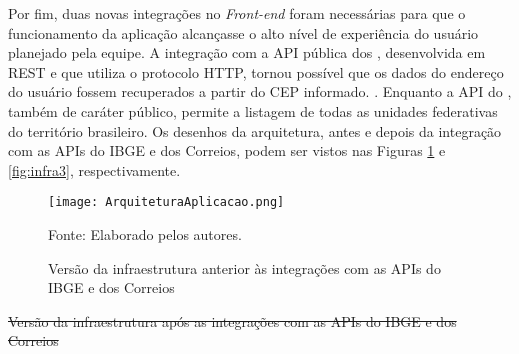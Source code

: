 \documentclass[
    12pt,               %
    openright,          %
    oneside,
    a4paper,            %
    BIBLATEX,           %
    TODO,               %
    english,            %
    brazil              %
    ]{ifsp-spo-inf-ctds}
\providecommand{\DIFdel}[1]{{\protect\color{red}\sout{#1}}}                      %
\providecommand{\DIFdelbegin}{} %
\providecommand{\DIFdelend}{} %
\providecommand{\DIFdelFL}[1]{\DIFdel{#1}} %
\newcommand{\DIFscaledelfig}{0.5}
\newlength{\DIFdelgraphicswidth} %
\newlength{\DIFdelgraphicsheight} %
\newcommand{\DIFdelincludegraphics}[2][]{%
\sbox{\DIFdelgraphicsbox}{\DIFOincludegraphics[#1]{#2}}%
\settoboxwidth{\DIFdelgraphicswidth}{\DIFdelgraphicsbox} %
\settoboxtotalheight{\DIFdelgraphicsheight}{\DIFdelgraphicsbox} %
\scalebox{\DIFscaledelfig}{%
\parbox[b]{\DIFdelgraphicswidth}{\usebox{\DIFdelgraphicsbox}\\[-\baselineskip] \rule{\DIFdelgraphicswidth}{0em}}\llap{\resizebox{\DIFdelgraphicswidth}{\DIFdelgraphicsheight}{%
\setlength{\unitlength}{\DIFdelgraphicswidth}%
\begin{picture}(1,1)%
\thicklines\linethickness{2pt} %
{\color[rgb]{1,0,0}\put(0,0){\framebox(1,1){}}}%
{\color[rgb]{1,0,0}\put(0,0){\line( 1,1){1}}}%
{\color[rgb]{1,0,0}\put(0,1){\line(1,-1){1}}}%
\end{picture}%
}\hspace*{3pt}}} %
} %
\DeclareRobustCommand{\DIFdelbegin}{\DIFOdelbegin \let\includegraphics\DIFdelincludegraphics} %
\DeclareRobustCommand{\DIFdelend}{\DIFOaddend \let\includegraphics\DIFOincludegraphics} %
\begin{document}
    Por fim, duas novas integrações no \emph{Front-end} foram necessárias para que o funcionamento da aplicação alcançasse o alto nível de experiência do usuário planejado pela equipe. A integração com a API pública dos , desenvolvida em REST e que utiliza o protocolo HTTP, tornou possível que os dados do endereço do usuário fossem recuperados a partir do CEP informado. . Enquanto a API do , também de caráter público, permite a listagem de todas as unidades federativas do território brasileiro.
    Os desenhos da arquitetura, antes e depois da integração com as APIs do IBGE e dos Correios, podem ser vistos nas Figuras \ref{fig:infra} e \ref{fig:infra3}, respectivamente.

    \begin{figure}[H]
        	\centering
            \caption{Versão da infraestrutura anterior às integrações com as APIs do IBGE e dos Correios}

        	\texttt{[image: ArquiteturaAplicacao.png]}
        	\label{fig:infra}

        	\centering
            {\footnotesize Fonte: Elaborado pelos autores.}
   \end{figure}

   \DIFdelbegin %
{%
\DIFdelFL{Versão da infraestrutura após as integrações com as APIs do IBGE e dos Correios}}
\DIFdelend %
\end{document}
